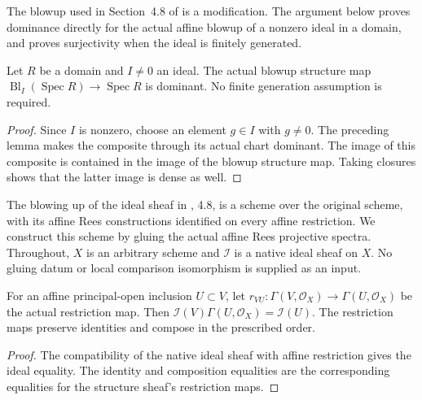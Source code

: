 \endgroup

\begingroup

The blowup used in Section~4.8 of \cite{deJong1996} is a modification.
The argument below proves dominance directly for the actual affine blowup
of a nonzero ideal in a domain, and proves surjectivity when the ideal is
finitely generated.

\begin{theorem}
\label{thm:affine-blowup-dominant}
\leanok
Let $R$ be a domain and $I\ne0$ an ideal. The actual blowup structure map
$\operatorname{Bl}_I(\operatorname{Spec}R)\to\operatorname{Spec}R$ is dominant.
No finite generation assumption is required.
\end{theorem}
\begin{proof}
Since $I$ is nonzero, choose an element $g\in I$ with $g\ne0$.
The preceding lemma makes the composite through its actual chart dominant.
The image of this composite is contained in the image of the blowup
structure map. Taking closures shows that the latter image is dense as well.
\end{proof}

\endgroup

\begingroup

The blowing up of the ideal sheaf in \cite{deJong1996}, 4.8, is a
scheme over the original scheme, with its affine Rees constructions
identified on every affine restriction. We construct this scheme by
gluing the actual affine Rees projective spectra. Throughout, $X$ is
an arbitrary scheme and $\mathcal I$ is a native ideal sheaf on $X$.
No gluing datum or local comparison isomorphism is supplied as an input.

\begin{lemma}
\label{lem:blowup-gluing-ideal-transitions}
\leanok
For an affine principal-open inclusion $U\subset V$, let
$r_{VU}:\Gamma(V,\mathcal O_X)\to\Gamma(U,\mathcal O_X)$ be the
actual restriction map. Then
$\mathcal I(V)\Gamma(U,\mathcal O_X)=\mathcal I(U)$.
The restriction maps preserve identities and compose in the prescribed order.
\end{lemma}
\begin{proof}
The compatibility of the native ideal sheaf with affine restriction
gives the ideal equality. The identity and composition equalities are
the corresponding equalities for the structure sheaf's restriction maps.
\end{proof}

